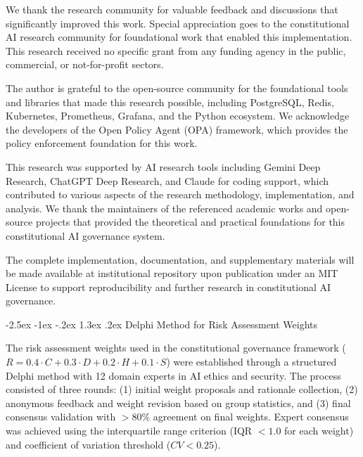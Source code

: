 \documentclass[manuscript,screen,9pt]{acmart}
\makeatletter
\renewcommand\section{\@startsection{section}{1}{\z@}%
  {-2.5ex \@plus -1ex \@minus -.2ex}%
  {1.3ex \@plus.2ex}%
  {\normalfont\Large\bfseries}}
\makeatother
\begin{document}
\begin{acks}
	We thank the research community for valuable feedback and discussions that significantly improved this work. Special appreciation goes to the constitutional AI research community for foundational work that enabled this implementation. This research received no specific grant from any funding agency in the public, commercial, or not-for-profit sectors.

	The author is grateful to the open-source community for the foundational tools and libraries that made this research possible, including PostgreSQL, Redis, Kubernetes, Prometheus, Grafana, and the Python ecosystem. We acknowledge the developers of the Open Policy Agent (OPA) framework, which provides the policy enforcement foundation for this work.

	This research was supported by AI research tools including Gemini Deep Research, ChatGPT Deep Research, and Claude for coding support, which contributed to various aspects of the research methodology, implementation, and analysis. We thank the maintainers of the referenced academic works and open-source projects that provided the theoretical and practical foundations for this constitutional AI governance system.

	The complete implementation, documentation, and supplementary materials will be made available at institutional repository upon publication under an MIT License to support reproducibility and further research in constitutional AI governance.
\end{acks}





\appendix

\section{Delphi Method for Risk Assessment Weights}
\label{app:delphi_method}

The risk assessment weights used in the constitutional governance framework ($R = 0.4 \cdot C + 0.3 \cdot D + 0.2 \cdot H + 0.1 \cdot S$) were established through a structured Delphi method with 12 domain experts in AI ethics and security. The process consisted of three rounds: (1) initial weight proposals and rationale collection, (2) anonymous feedback and weight revision based on group statistics, and (3) final consensus validation with $>80\%$ agreement on final weights. Expert consensus was achieved using the interquartile range criterion (IQR $< 1.0$ for each weight) and coefficient of variation threshold ($CV < 0.25$).
\end{document}

